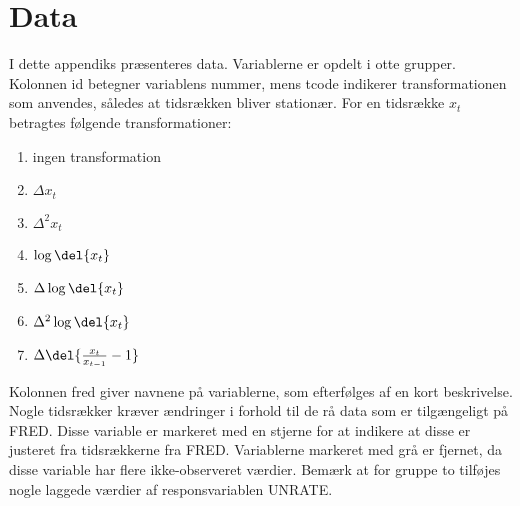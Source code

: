 \chapter{Data} \label{app:app_data}

I dette appendiks præsenteres data. 
Variablerne er opdelt i otte grupper.
Kolonnen id betegner variablens nummer, mens tcode indikerer transformationen som anvendes, således at tidsrækken bliver stationær. For en tidsrække $x_t$ betragtes følgende transformationer:
\begin{multicols}{2}
\begin{enumerate}
\item ingen transformation
\item \(\Delta x_t\)
\item \(\Delta^2 x_t\)
\item \(\log \del{x_t}\)
\item \(\Delta \log \del{x_t}\)
\item \(\Delta^2 \log \del{x_t}\)
\item \(\Delta \del{\frac{x_t}{x_{t-1}}-1}\)
\end{enumerate}
\end{multicols}

%
%
Kolonnen fred giver navnene på variablerne, som efterfølges af en kort beskrivelse.
Nogle tidsrækker kræver ændringer i forhold til de rå data som er tilgængeligt på FRED.
Disse variable er markeret med en stjerne for at indikere at disse er justeret fra tidsrækkerne fra FRED.
Variablerne markeret med grå er fjernet, da disse variable har flere ikke-observeret værdier.
Bemærk at for gruppe to tilføjes nogle laggede værdier af responsvariablen UNRATE.



%





